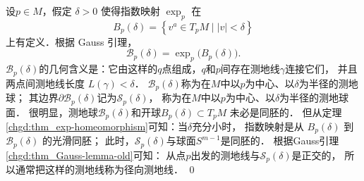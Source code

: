 \begin{remark}\label{chgd:rmk_geo-sph}
设$p \in M$，假定 $\delta>0$ 使得指数映射 $\exp _p$ 在
\begin{equation}\label{chgd:eqn_Ball}
    B_p(\delta)=\left\{v^a \in T_p M \mid  |v|<\delta\right\}
\end{equation}
上有定义．根据 Gauss 引理，
\begin{equation}\label{chgd:eqn_gdBall}
    \mathscr{B}_p(\delta)  =\exp _p\bigl(B_p(\delta)\bigr) .
\end{equation}
$\mathscr{B}_p(\delta)$的几何含义是：它由这样的$q$点组成，$q$和$p$间存在测地线$\gamma$连接它们，  
并且两点间测地线长度 $L(\gamma)<\delta$．
$\mathscr{B}_p(\delta)$称为在$M$中以$p$为中心、以$\delta$为半径的{\heiti 测地球}；
其边界$\partial \mathscr{B}_p(\delta)$记为$\mathscr{S}_p(\delta)$，
称为在$M$中以$p$为中心、以$\delta$为半径的{\heiti 测地球面}．
很明显，测地球$\mathscr{B}_p(\delta)$和开球$B_p(\delta) \subset T_p M$ 未必是同胚的．
但从定理\ref{chgd:thm_exp-homeomorphism}可知：当$\delta$充分小时，
指数映射是从 $B_p(\delta)$ 到 $\mathscr{B}_p(\delta)$ 的光滑同胚；
此时，$\mathscr{S}_p(\delta)$与球面$S^{m-1}$是同胚的．
根据Gauss引理\ref{chgd:thm_Gauss-lemma-old}可知：
从点$p$出发的测地线与$\mathscr{S}_p(\delta)$是正交的，
所以通常把这样的测地线称为{\heiti 径向测地线}． \qed
\end{remark}


